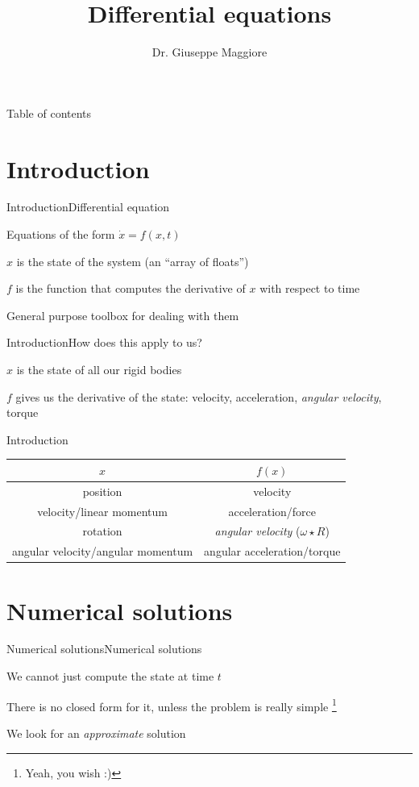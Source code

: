 \documentclass{beamer}
\title{Differential equations}
\author{Dr. Giuseppe Maggiore}
\institute{NHTV University of Applied Sciences \\ 
Breda, Netherlands}
\date{}
\begin{document}
\maketitle

\begin{frame}{Table of contents}
\tableofcontents
\end{frame}

\section{Introduction}
\begin{slide}{Introduction}{Differential equation}{
\item Equations of the form $\dot x = f(x,t)$
\item $x$ is the state of the system (an ``array of floats'')
\item $f$ is the function that computes the derivative of $x$ with respect to time
\item General purpose toolbox for dealing with them
}\end{slide}

\begin{slide}{Introduction}{How does this apply to us?}{
\item $x$ is the state of all our rigid bodies
\item $f$ gives us the derivative of the state: velocity, acceleration, \textit{angular velocity}, torque
}\end{slide}

\begin{frame}{Introduction}
\begin{tabular}{| c | c |}
\hline
$x$ & $f(x)$ \\
\hline
position & velocity \\
velocity/linear momentum & acceleration/force \\
rotation & \textit{angular velocity} ($\omega \star R$) \\
angular velocity/angular momentum & angular acceleration/torque \\
\hline
\end{tabular}
\end{frame}

\section{Numerical solutions}
\begin{slide}{Numerical solutions}{Numerical solutions}{
\item We cannot just compute the state at time $t$
\item There is no closed form for it, unless the problem is really simple \footnote{Yeah, you wish :)}
\item We look for an \textit{approximate} solution
}\end{slide}
\end{document}
